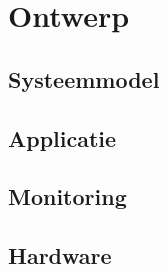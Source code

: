 \part{Ontwerp}
\label{part:ontwerp}

%
%

\chapter{Systeemmodel}
\label{chap:systeemmodel}


%
%

\chapter{Applicatie}
\label{chap:applicatie}


%
%

\chapter{Monitoring}
\label{chap:monitoring}


%
%

\chapter{Hardware}
\label{chap:hardware}
